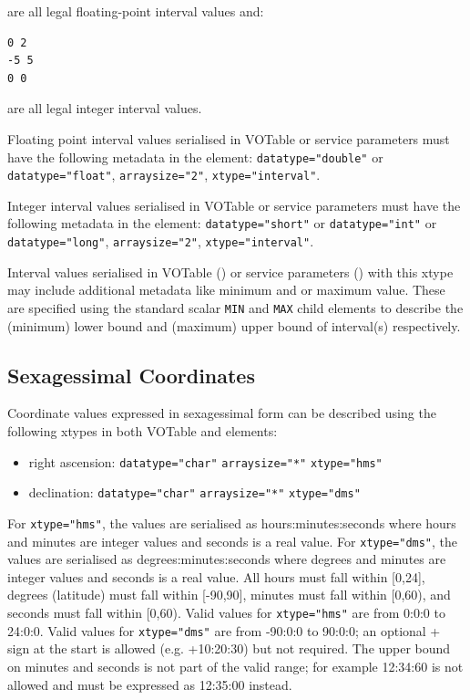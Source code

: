 \documentclass[11pt,letter]{ivoa}
\begin{document}
\noindent are all legal floating-point interval values and:

\begin{verbatim}
0 2
-5 5
0 0
\end{verbatim}

\noindent are all legal integer interval values.

Floating point interval values serialised in VOTable or service parameters must have the following metadata in the
 element: \verb|datatype="double"| or \verb|datatype="float"|,
\verb|arraysize="2"|, \verb|xtype="interval"|.

Integer interval values serialised in VOTable or service parameters must have the following metadata in the
 element: \verb|datatype="short"| or \verb|datatype="int"| or
\verb|datatype="long"|, \verb|arraysize="2"|, \verb|xtype="interval"|.

Interval values serialised in VOTable () or service parameters
() with this xtype may include additional metadata like minimum and
or maximum value. These are specified using the standard scalar \verb|MIN| and
\verb|MAX| child elements to describe the (minimum) lower bound and (maximum)
upper bound of interval(s) respectively.

\subsection{Sexagessimal Coordinates}
Coordinate values expressed in sexagessimal form can be described using the following
xtypes in both VOTable  and  elements:

\begin{itemize}
\item right ascension: \verb|datatype="char"| \verb|arraysize="*"| \verb|xtype="hms"|
\item declination: \verb|datatype="char"| \verb|arraysize="*"| \verb|xtype="dms"|
\end{itemize}

For \verb|xtype="hms"|, the values are serialised as hours:minutes:seconds where hours
and minutes are integer values and seconds is a real value. For \verb|xtype="dms"|, the values
are serialised as degrees:minutes:seconds where degrees and minutes are integer
values and seconds is a real value. All hours must fall within [0,24], degrees
(latitude) must fall within [-90,90], minutes must fall within [0,60), and seconds
must fall within [0,60). Valid values for \verb|xtype="hms"| are from 0:0:0 to 24:0:0.
Valid values for \verb|xtype="dms"| are from -90:0:0 to 90:0:0; an optional + sign at
the start is allowed (e.g. +10:20:30) but not required. The upper bound on minutes 
and seconds is not part of the valid range; for example 12:34:60 is not allowed and must 
be expressed as 12:35:00 instead.
\end{document}
